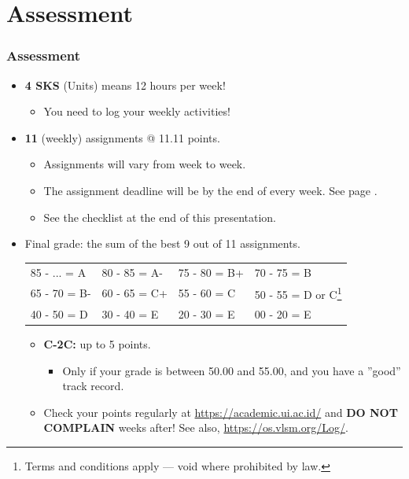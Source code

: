 \documentclass[xcolor=table, notheorems, hyperref={pdfpagelabels=false}]{beamer}
\begin{document}
\section{Assessment}
\begin{frame}
\frametitle{Assessment}
\begin{itemize}
\item \textbf{4 SKS} (Units) means 12 hours per week!
\begin{itemize}
\item You need to log your weekly activities!
\end{itemize}
\item \textbf{11} (weekly) assignments @ 11.11 points.
\begin{itemize}
\item Assignments will vary from week to week.
\item The assignment deadline will be by the end of every week. See page \pageref{laman}.
\item See the checklist at the end of this presentation.
\end{itemize}
\item Final grade: the sum of the best 9 out of 11 assignments.
\begin{tabular}{l l l l}
\hline
85 - ... = A & 80 - 85 = A- & 75 - 80 = B+ & 70 - 75 = B \\
65 - 70 = B-      & 60 - 65 = C+ & 55 - 60 = C  & 
50 - 55 = D or C\footnote{Terms and conditions apply --- void where prohibited by law.}  \\
40 - 50 = D  & 30 - 40 = E  & 20 - 30 = \small E & 00 - 20 = \tiny E   \\
\hline
\end{tabular}

\begin{itemize}
\item \textbf{C-2C:} up to 5 points.
\begin{itemize}
\item Only if your grade is between 50.00 and 55.00, and you have a ''good'' track record.
\end{itemize}
\item Check your points regularly at \url{https://academic.ui.ac.id/} and 
      \textbf{DO NOT COMPLAIN} weeks after! See also, \url{https://os.vlsm.org/Log/}.
\end{itemize}
\end{itemize}

\end{frame}
\end{document}
